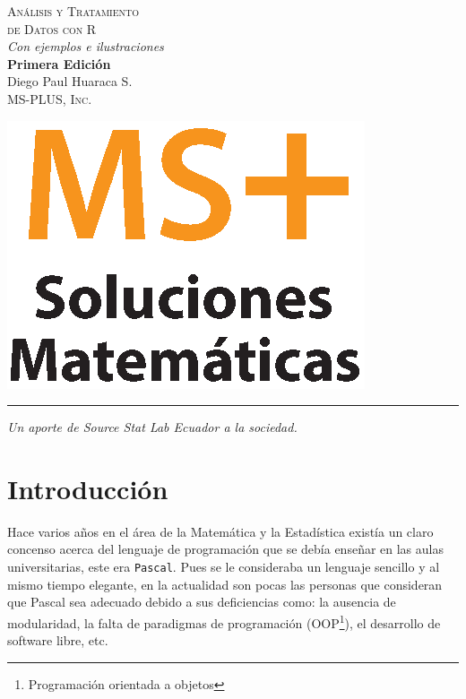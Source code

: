 \documentclass[11pt,a4paper,oneside]{book}\usepackage[]{graphicx}\usepackage[]{color}
\begin{document}
\newcommand*{\titleBOOK}{\begingroup
\raggedleft
\vspace*{\baselineskip}
{\Huge\scshape Análisis y Tratamiento \\[5mm]
de Datos con R} \\ [\baselineskip]
{\itshape Con ejemplos e ilustraciones}\\[40mm]
{\Large\bfseries Primera Edición}\\[0.3 \textheight]
{\Large Diego Paul Huaraca S.}\\
{\large\scshape MS-PLUS, Inc.}\par
\vfill
\begin{flushleft}
{\Large \includegraphics[scale=0.4]{figuras/msplus.eps}}\\
\rule{\textwidth}{0.5pt}
\end{flushleft}
\vspace*{\baselineskip}
\endgroup}
\titleBOOK



\setcounter{page}{0}
\cleardoublepage
{}
\hfill
\begin{minipage}[t]{0.66\textwidth}
\raggedleft
\thispagestyle{empty}
\textit{Un aporte de Source Stat Lab Ecuador a la sociedad.}
\end{minipage}
\clearpage

\tableofcontents




\chapter{Introducción}

Hace varios años en el área de la Matemática y la Estadística existía un claro concenso acerca del lenguaje de programación que se debía enseñar en las aulas universitarias, este era \texttt{Pascal}. Pues se le consideraba un lenguaje sencillo y al mismo tiempo elegante, en la actualidad son pocas las personas que consideran que Pascal sea adecuado debido a sus deficiencias como: la ausencia de modularidad, la falta de paradigmas de programación (OOP\footnote{Programación orientada a objetos}), el desarrollo de software libre, etc.\newline
\end{document}
